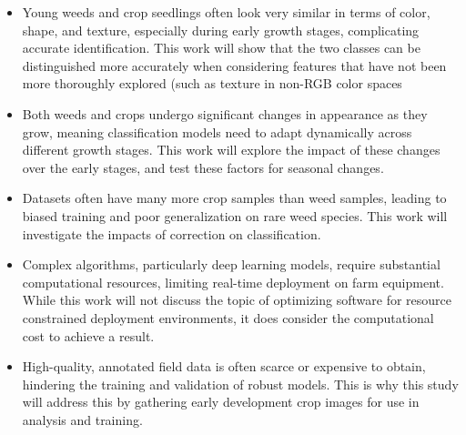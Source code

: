 \documentclass[letterpaper]{report}
\begin{document}
\begin{itemize}

\item{Young weeds and crop seedlings often look very similar in terms of color, shape, and texture, especially during early growth stages, complicating accurate identification. This work will show that the two classes can be distinguished more accurately when considering features that have not been more thoroughly explored (such as texture in non-RGB color spaces}

\item{Both weeds and crops undergo significant changes in appearance as they grow, meaning classification models need to adapt dynamically across different growth stages. This work will explore the impact of these changes over the early stages, and test these factors for seasonal changes.}

\item{Datasets often have many more crop samples than weed samples, leading to biased training and poor generalization on rare weed species. This work will investigate the impacts of correction on classification.}

\item{Complex algorithms, particularly deep learning models, require substantial computational resources, limiting real-time deployment on farm equipment. While this work will not discuss the topic of optimizing software for resource constrained deployment environments, it does consider the computational cost to achieve a result.}

\item{High-quality, annotated field data is often scarce or expensive to obtain, hindering the training and validation of robust models. This is why this study will address this by gathering early development crop images for use in analysis and training.}

\end{itemize}
\end{document}
